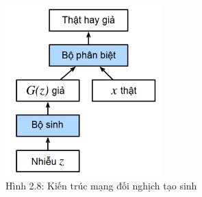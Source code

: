 \documentclass[a4paper]{article}
\begin{document}
\begin{figure}[h!]
\centering
\includegraphics[width=6cm]{images/2_71.PNG}
\caption{Hình 2.8: Kiến trúc mạng đối nghịch tạo sinh}
\end{figure}
\end{document}
